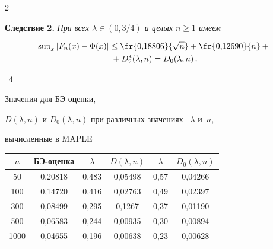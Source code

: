 \begin{multicols}{2}
\noindent


\textbf{Следствие 2.} \textit{При всех $\lambda \in (0,3/4)$  и целых $n\geq 1$ имеем}


\begin{multline}


\sup\nolimits_x \left\vert F_n(x) - \Phi(x)\right\vert \leq  \fr{0{,}18806}{\sqrt{n}}+


\fr{0{,}12690}{n} +{}\\


{}+D_2^*(\lambda,n)= D_0(\lambda,n)\,.


\label{g6b}


\end{multline}





\noindent


\begin{center}


\parbox{80mm}{{\tablename~4}\ \ \small{Значения для БЭ-оценки, 


$D(\lambda,n)$ и $D_0(\lambda,n)$ при различных значениях~ $\lambda$ и~$n$, 


вычисленные в    MAPLE}}







\vspace*{2ex}


\tabcolsep=4.5pt


{\small 


\begin{tabular}{|c|c||c|c||c|c|}


\hline


$n$    &БЭ-оценка & $\lambda$ &   $D(\lambda,n)$ & $\lambda$ & $D_0(\lambda,n)$\\


\hline


\hphantom{9}50   & 0,20818 & 0,483 & 0,05498 & 0,57 & 0,04266\\


100  & 0,14720 & 0,416 & 0,02763 & 0,49 & 0,02397\\


300 & 0,08499 & 0,295 & 0,1267\hphantom{9} & 0,37 & 0,01190\\


500 & 0,06583 & 0,244 & 0,00935 & 0,30 & 0,00894\\


1000\hphantom{9} & 0,04655 & 0,196 & 0,00638 & 0,23 & 0,00628\\



\end{tabular}}
\end{center}
\end{multicols}
